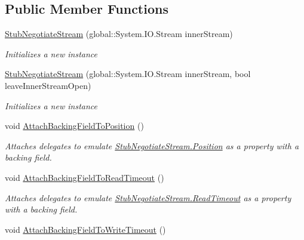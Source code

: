 \subsection*{Public Member Functions}
\begin{DoxyCompactItemize}
\item 
\hyperlink{class_system_1_1_net_1_1_security_1_1_fakes_1_1_stub_negotiate_stream_a4e923e19151bd074c083b25c1e5e7322}{Stub\-Negotiate\-Stream} (global\-::\-System.\-I\-O.\-Stream inner\-Stream)
\begin{DoxyCompactList}\small\item\em Initializes a new instance\end{DoxyCompactList}\item 
\hyperlink{class_system_1_1_net_1_1_security_1_1_fakes_1_1_stub_negotiate_stream_a4e1d773d75929938da3aefe101d50b07}{Stub\-Negotiate\-Stream} (global\-::\-System.\-I\-O.\-Stream inner\-Stream, bool leave\-Inner\-Stream\-Open)
\begin{DoxyCompactList}\small\item\em Initializes a new instance\end{DoxyCompactList}\item 
void \hyperlink{class_system_1_1_net_1_1_security_1_1_fakes_1_1_stub_negotiate_stream_a98494139fbc530df1f2c4baff5dfbcf8}{Attach\-Backing\-Field\-To\-Position} ()
\begin{DoxyCompactList}\small\item\em Attaches delegates to emulate \hyperlink{class_system_1_1_net_1_1_security_1_1_fakes_1_1_stub_negotiate_stream_acd2c685315bd0920f4b6af9b7fce9118}{Stub\-Negotiate\-Stream.\-Position} as a property with a backing field.\end{DoxyCompactList}\item 
void \hyperlink{class_system_1_1_net_1_1_security_1_1_fakes_1_1_stub_negotiate_stream_a53c3a54ba0022e870ff35ace766fb5bb}{Attach\-Backing\-Field\-To\-Read\-Timeout} ()
\begin{DoxyCompactList}\small\item\em Attaches delegates to emulate \hyperlink{class_system_1_1_net_1_1_security_1_1_fakes_1_1_stub_negotiate_stream_ac1db99bc5cfccc29173356f0c64a86cd}{Stub\-Negotiate\-Stream.\-Read\-Timeout} as a property with a backing field.\end{DoxyCompactList}\item 
void \hyperlink{class_system_1_1_net_1_1_security_1_1_fakes_1_1_stub_negotiate_stream_a86b3c65b0dd4cd2d3f75ac3cc8865b2b}{Attach\-Backing\-Field\-To\-Write\-Timeout} ()

\end{DoxyCompactItemize}
